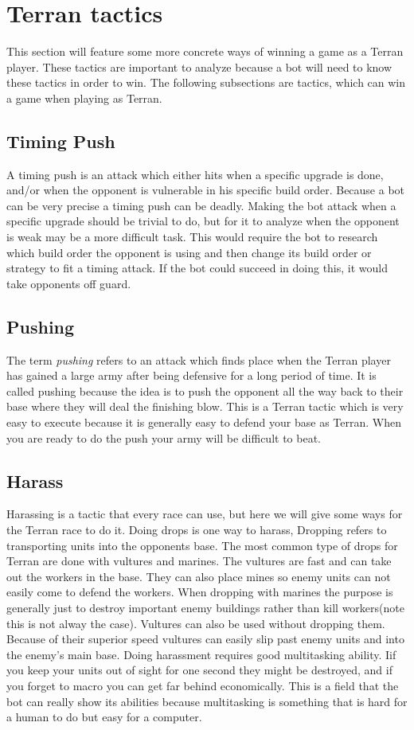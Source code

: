 \section{Terran tactics}
	This section will feature some more concrete ways of winning a game as a Terran player. 
	These tactics are important to analyze because a bot will need to know these tactics in order to win.
	The following subsections are tactics, which can win a game when playing as Terran.
	
	\subsection{Timing Push}
		A timing push is an attack which either hits when a specific upgrade is done, and/or when the opponent is vulnerable in his specific build order. 
		Because a bot can be very precise a timing push can be deadly. Making the bot attack when a specific upgrade should be trivial to do, but for it to 
		analyze when the opponent is weak may be a more difficult task. This would require the bot to research which build order the opponent is using and 
		then change its build order or strategy to fit a timing attack. If the bot could succeed in doing this, it would take opponents off guard.
		
	\subsection{Pushing}
		The term {\it pushing} refers to an attack which finds place when the Terran player has gained a large army after being defensive for a long 
		period of time. It is called pushing because the idea is to push the opponent 
		all the way back to their base where they will deal the finishing blow. This is a Terran tactic which is very easy to execute because it is generally
		easy to defend your base as Terran. When you are ready to do the push your army will be difficult to beat.
		
	\subsection{Harass}
		Harassing is a tactic that every race can use, but here we will give some ways for the Terran race to do it. Doing drops is one way to harass, Dropping 
		refers to transporting units into the opponents base. The most common type of drops for Terran are done with vultures and marines. The vultures are 
		fast and can take out the workers in the base. They can also place mines so enemy units can not easily come to defend the workers. When dropping with marines 
		the purpose is generally just to destroy important enemy buildings rather than kill workers(note this is not alway the case). Vultures can also be used without 
		dropping them. Because of their superior speed vultures can easily slip past enemy units and into the enemy's main base. Doing harassment requires 
		good multitasking ability. Iif you keep your units out of sight for one second they might be destroyed, and if you forget to macro you can 
		get far behind economically. This is a field that the bot can really show its abilities because multitasking is something that is hard for a human to do but 
		easy for a computer.
	
